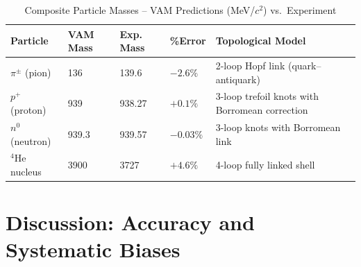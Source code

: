 \documentclass[11pt]{article}
\begin{document}
\begin{table}[h!]
    \centering
    \begin{tabular}{lllll}
        \toprule
        \textbf{Particle} & \textbf{VAM Mass} & \textbf{Exp. Mass} & \textbf{\%Error} & \textbf{Topological Model} \\
        \midrule
        $\pi^{\pm}$ (pion) & 136 & 139.6 & $-2.6\%$ & 2-loop Hopf link (quark–antiquark) \\
        $p^+$ (proton) & 939 & 938.27 & $+0.1\%$ & 3-loop trefoil knots with Borromean correction \\
        $n^0$ (neutron) & 939.3 & 939.57 & $-0.03\%$ & 3-loop knots with Borromean link \\
        $^4$He nucleus & 3900 & 3727 & $+4.6\%$ & 4-loop fully linked shell \\
        \bottomrule
    \end{tabular}
    \caption{Composite Particle Masses – VAM Predictions (MeV/$c^2$) vs.\ Experiment}
    \label{tab:composites}
\end{table}

\section{Discussion: Accuracy and Systematic Biases}
\end{document}
